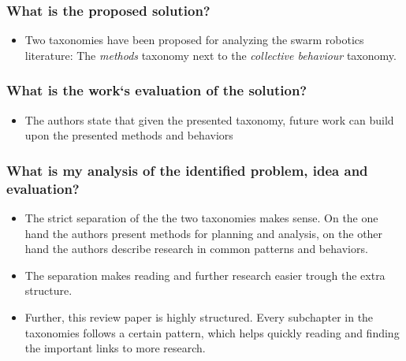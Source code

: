 \subsubsection*{What is the proposed solution?}
\begin{itemize}
    \item Two taxonomies have been proposed for analyzing the swarm robotics literature: The \emph{methods} taxonomy next to the \emph{collective behaviour} taxonomy.
\end{itemize}
\subsubsection*{What is the work`s evaluation of the solution?}
\begin{itemize}
    \item The authors state that given the presented taxonomy, future work can build upon the presented methods and behaviors
\end{itemize}
\subsubsection*{What is my analysis of the identified problem, idea and evaluation?}
\begin{itemize}
    \item The strict separation of the the two taxonomies makes sense. On the one hand the authors present methods for planning and analysis, on the other hand the authors describe research in common patterns and behaviors.
    \item The separation makes reading and further research easier trough the extra structure.
    \item Further, this review paper is highly structured. Every subchapter in the taxonomies follows a certain pattern, which helps quickly reading and finding the important links to more research. 
\end{itemize}
